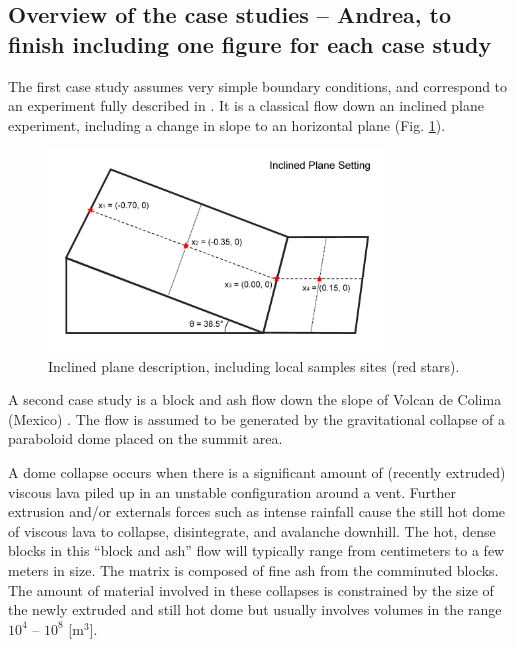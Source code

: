 \documentclass{article}
\begin{document}
\subsection{Overview of the case studies -- Andrea, to finish including one figure for each case study}
The first case study assumes very simple boundary conditions, and correspond to an experiment fully described in \cite{Webb2004, WebbBursik2016}. It is a classical flow down an inclined plane experiment, including a change in slope to an horizontal plane (Fig. \ref{fig:Ramp-first}).

\begin{figure}[H]
    \includegraphics[width=0.8\textwidth]{inclPlaneFig.jpg}
    \centering
    \caption{Inclined plane description, including local samples sites (red stars).}
    \label{fig:Ramp-first}
\end{figure}

A second case study is a block and ash flow down the slope of Volcan de Colima (Mexico) \citep{DelPozzo1995,Sheridan1995, Zobin2002, Saucedo2002,Saucedo2004,Saucedo2005, Rupp2006,Capra2011,Zobin2015, ReyesDaVilla2016}. The flow is assumed to be generated by the gravitational collapse of a paraboloid dome placed on the summit area.

A dome collapse occurs when there is a significant amount of (recently extruded) viscous lava piled up in an unstable configuration around a vent. Further extrusion and/or externals forces such as intense rainfall cause the still hot dome of viscous lava to collapse, disintegrate, and avalanche downhill. The hot, dense blocks in this ``block and ash'' flow will typically range from centimeters to a few meters in size. The matrix is composed of fine ash from the comminuted blocks. The amount of material involved in these collapses is constrained by the size of the newly extruded and still hot dome but usually involves volumes in the range $10^4$ -- $10^8$ [$\mathrm{m^3}$].
\end{document}
